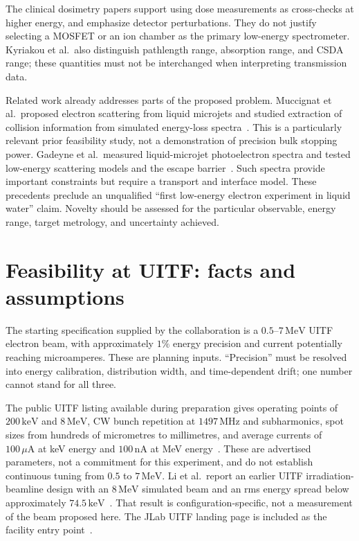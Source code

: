\documentclass[11pt,letterpaper]{article}
\newcommand{\keV}{\,\mathrm{keV}}
\newcommand{\MeV}{\,\mathrm{MeV}}
\begin{document}
The clinical dosimetry papers support using dose measurements as cross-checks at higher energy, and
emphasize detector perturbations. They do not justify selecting a MOSFET or an ion chamber as the
primary low-energy spectrometer. Kyriakou et al.\ also distinguish pathlength range, absorption range,
and CSDA range; these quantities must not be interchanged when interpreting transmission data.

Related work already addresses parts of the proposed problem. Muccignat et al.\ proposed electron
scattering from liquid microjets and studied extraction of collision information from simulated
energy-loss spectra~\cite{muccignat}. This is a particularly relevant prior feasibility study, not a
demonstration of precision bulk stopping power. Gadeyne et al.\ measured liquid-microjet
photoelectron spectra and tested low-energy scattering models and the escape
barrier~\cite{gadeyne,gadeyne-correction}. Such spectra provide important constraints but require a
transport and interface model. These precedents preclude an unqualified ``first low-energy electron
experiment in liquid water'' claim. Novelty should be assessed for the particular observable, energy
range, target metrology, and uncertainty achieved.

\section{Feasibility at UITF: facts and assumptions}

The starting specification supplied by the collaboration is a $0.5$--$7\MeV$ UITF electron beam,
with approximately $1\%$ energy precision and current potentially reaching microamperes. These are
planning inputs. ``Precision'' must be resolved into energy calibration, distribution width, and
time-dependent drift; one number cannot stand for all three.

The public UITF listing available during preparation gives operating points of $200\keV$ and
$8\MeV$, CW bunch repetition at $1497\,\mathrm{MHz}$ and subharmonics, spot sizes from hundreds of
micrometres to millimetres, and average currents of $100\,\mu\mathrm{A}$ at keV energy and
$100\,\mathrm{nA}$ at MeV energy~\cite{uitf}. These are advertised parameters, not a commitment for
this experiment, and do not establish continuous tuning from $0.5$ to $7\MeV$. Li et al.\ report
an earlier UITF irradiation-beamline design with an $8\MeV$ simulated beam and an rms energy spread
below approximately $74.5\keV$~\cite{li}. That result is configuration-specific, not a measurement of
the beam proposed here. The JLab UITF landing page is included as the facility entry point~\cite{jlab}.
\end{document}
